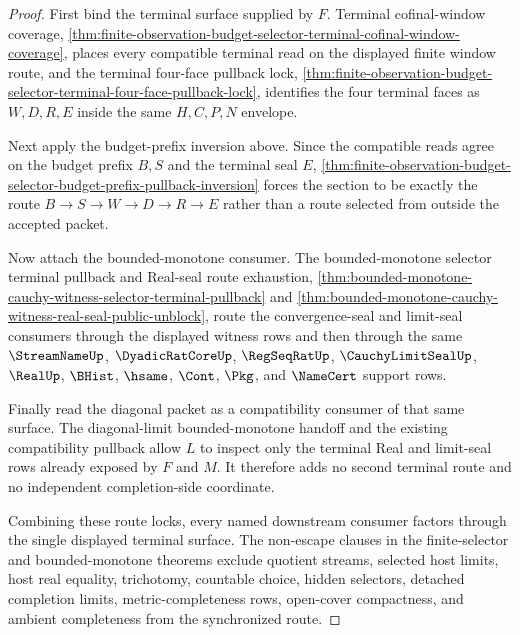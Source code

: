 \begin{proof}
First bind the terminal surface supplied by $F$. Terminal cofinal-window coverage, \autoref{thm:finite-observation-budget-selector-terminal-cofinal-window-coverage}, places every compatible terminal read on the displayed finite window route, and the terminal four-face pullback lock, \autoref{thm:finite-observation-budget-selector-terminal-four-face-pullback-lock}, identifies the four terminal faces as $W,D,R,E$ inside the same $H,C,P,N$ envelope.

Next apply the budget-prefix inversion above. Since the compatible reads agree on the budget prefix $B,S$ and the terminal seal $E$, \autoref{thm:finite-observation-budget-selector-budget-prefix-pullback-inversion} forces the section to be exactly the route $B \to S \to W \to D \to R \to E$ rather than a route selected from outside the accepted packet.

Now attach the bounded-monotone consumer. The bounded-monotone selector terminal pullback and Real-seal route exhaustion, \autoref{thm:bounded-monotone-cauchy-witness-selector-terminal-pullback} and \autoref{thm:bounded-monotone-cauchy-witness-real-seal-public-unblock}, route the convergence-seal and limit-seal consumers through the displayed witness rows and then through the same $\StreamNameUp$, $\DyadicRatCoreUp$, $\RegSeqRatUp$, $\CauchyLimitSealUp$, $\RealUp$, $\BHist$, $\hsame$, $\Cont$, $\Pkg$, and $\NameCert$ support rows.

Finally read the diagonal packet as a compatibility consumer of that same surface. The diagonal-limit bounded-monotone handoff and the existing compatibility pullback allow $L$ to inspect only the terminal Real and limit-seal rows already exposed by $F$ and $M$. It therefore adds no second terminal route and no independent completion-side coordinate.

Combining these route locks, every named downstream consumer factors through the single displayed terminal surface. The non-escape clauses in the finite-selector and bounded-monotone theorems exclude quotient streams, selected host limits, host real equality, trichotomy, countable choice, hidden selectors, detached completion limits, metric-completeness rows, open-cover compactness, and ambient completeness from the synchronized route.
\end{proof}

